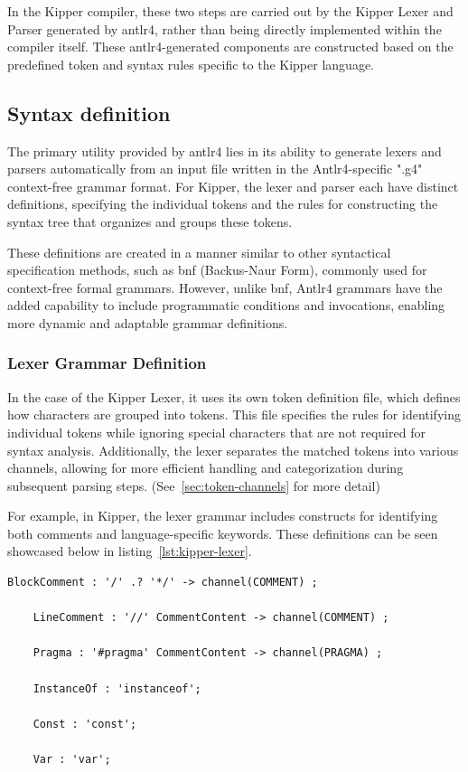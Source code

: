 In the Kipper compiler, these two steps are carried out by the Kipper Lexer and Parser generated by \Gls{antlr4}, rather than being directly implemented within the compiler itself. These \Gls{antlr4}-generated components are constructed based on the predefined token and syntax rules specific to the Kipper language.

\subsection{Syntax definition}

The primary utility provided by \Gls{antlr4} lies in its ability to generate lexers and parsers automatically from an input file written in the Antlr4-specific ".g4" context-free grammar format. For Kipper, the lexer and parser each have distinct definitions, specifying the individual tokens and the rules for constructing the syntax tree that organizes and groups these tokens.

These definitions are created in a manner similar to other syntactical specification methods, such as \acrshort{bnf} (Backus-Naur Form), commonly used for context-free formal grammars. However, unlike \acrshort{bnf}, Antlr4 grammars have the added capability to include programmatic conditions and invocations, enabling more dynamic and adaptable grammar definitions.

\subsubsection{Lexer Grammar Definition}
\label{sec:lexer-grammar-definition}

In the case of the Kipper Lexer, it uses its own token definition file, which defines how characters are grouped into tokens. This file specifies the rules for identifying individual tokens while ignoring special characters that are not required for syntax analysis. Additionally, the lexer separates the matched tokens into various channels, allowing for more efficient handling and categorization during subsequent parsing steps. (See~\ref{sec:token-channels} for more detail)

For example, in Kipper, the lexer grammar includes constructs for identifying both comments and language-specific keywords. These definitions can be seen showcased below in listing~\ref{lst:kipper-lexer}.

\begin{lstlisting}[language=antlr4, caption={Sample snippet from Kipper Lexer grammar}, label={lst:kipper-lexer}]
	BlockComment : '/' .? '*/' -> channel(COMMENT) ;
	
	LineComment : '//' CommentContent -> channel(COMMENT) ;
	
	Pragma : '#pragma' CommentContent -> channel(PRAGMA) ;
	
	InstanceOf : 'instanceof';
	
	Const : 'const';
	
	Var : 'var';
\end{lstlisting}

